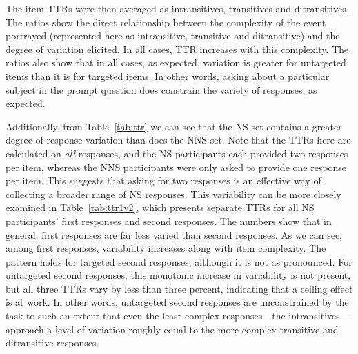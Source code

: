 The item TTRs were then averaged as intransitives, transitives and ditransitives. The ratios show the direct relationship between the complexity of the event portrayed (represented here as intransitive, transitive and ditransitive) and the degree of variation elicited. In all cases, TTR increases with this complexity.
The ratios also show that in all cases, as expected, variation is greater for untargeted items than it is for targeted items. In other words, asking about a particular subject in the prompt question does constrain the variety of responses, as expected.

Additionally, from Table~\ref{tab:ttr} we can see that the NS set contains a greater degree of response variation than does the NNS set. Note that the TTRs here are calculated on \textit{all} responses, and the NS participants each provided two responses per item, whereas the NNS participants were only asked to provide one response per item. This suggests that asking for two responses is an effective way of collecting a broader range of NS responses. This variability can be more closely examined in Table~\ref{tab:ttr1v2}, which presents separate TTRs for all NS participants' first responses and second responses. The numbers show that in general, first responses are far less varied than second responses. As we can see, among first responses, variability increases along with item complexity. The pattern holds for targeted second responses, although it is not as pronounced. For untargeted second responses, this monotonic increase in variability is not present, but all three TTRs vary by less than three percent, indicating that a ceiling effect is at work. In other words, untargeted second responses are unconstrained by the task to such an extent that even the least complex responses---the intransitives---approach a level of variation roughly equal to the more complex transitive and ditransitive responses.

